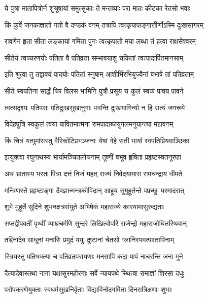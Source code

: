 \twolineshloka
{ये पुत्रा मातापित्रोर्न शुश्रूषायां समुत्सुकाः}
{ते मन्तव्याः परा मातः कीटका रेतसो भवाः}%

\twolineshloka
{किं कुर्वे जनकाज्ञातो गतो वै दण्डकं वनम्}
{तत्रापि त्वत्कृपापाङ्गात्तीर्णोऽस्मि दुःखसागरम्}%

\twolineshloka
{रावणेन हृता सीता लङ्कायां गमिता पुनः}
{त्वत्कृपातो मया लब्धा तं हत्वा राक्षसेश्वरम्}%

\twolineshloka
{सीतेयं त्वच्चरणयोः पतिता वै पतिव्रता}
{सम्भावयाशु चकितां त्वत्पादार्पितमानसाम्}%

\twolineshloka
{इति श्रुत्वा तु तद्वाक्यं पादयोः पतितां स्नुषाम्}
{आशीर्भिरभियुज्यैनां बभाषे तां पतिव्रताम्}%

\twolineshloka
{सीते स्वपतिना सार्द्धं चिरं विलस भामिनि}
{पुत्रौ प्रसूय च कुलं स्वकं पावय पावने}%

\twolineshloka
{त्वत्सदृश्यः पतिपराः पतिदुःखसुखानुगाः}
{भवन्ति दुःखभागिन्यो न हि सत्यं जगत्त्रये}%

\twolineshloka
{विदेहपुत्रि स्वकुलं त्वया पावितमात्मना}
{रामपादाब्जयुगलमनुयान्त्या महावनम्}%

\twolineshloka
{किं चित्रं यत्पुमांसस्तु वैरिकोटिप्रभञ्जनाः}
{येषां गेहे सती भार्या स्वपतिप्रियवाञ्छिका}%

\twolineshloka
{इत्युक्त्वा रघुनाथस्य भार्यामञ्चितलोचनाम्}
{तूष्णीं बभूव हृषिता प्रहृष्टस्वतनूरुहा}%

\twolineshloka
{अथ भ्रातास्य भरतः पित्रा दत्तं निजं महत्}
{राज्यं निवेदयामास रामचन्द्राय धीमते}%

\twolineshloka
{मन्त्रिणस्ते प्रहृष्टाङ्गा दैवज्ञान्मन्त्रकोविदान्}
{आहूय सुमुहूर्तन्ते पप्रच्छुः परमादरात्}%

\twolineshloka
{शुभे मुहूर्ते सुदिने शुभनक्षत्रसंयुते}
{अभिषेकं महाराज्ये कारयामासुरुद्यताः}%

\twolineshloka
{सप्तद्वीपवतीं पृथ्वीं व्याघ्रचर्मणि सुन्दरे}
{लिखित्वोपरि राजेन्द्रो महाराजोधितस्थिवान्}%

\twolineshloka
{तद्दिनादेव साधूनां मनांसि प्रमुदं ययुः}
{दुष्टानां चेतसो ग्लानिरभवत्परतापिनाम्}%

\twolineshloka
{स्त्रियस्तु पतिभक्त्या च पतिव्रतपरायणाः}
{मनसापि कदा पापं नाचरन्ति जना मुने}%

\twolineshloka
{दैत्यादेवास्तथा नागा यक्षासुरमहोरगाः}
{सर्वे न्यायपथे स्थित्वा रामाज्ञां शिरसा दधुः}%

\twolineshloka
{परोपकरणेयुक्ताः स्वधर्मसुखनिर्वृताः}
{विद्याविनोदगमिता दिनरात्रिक्षणाः शुभाः}%

